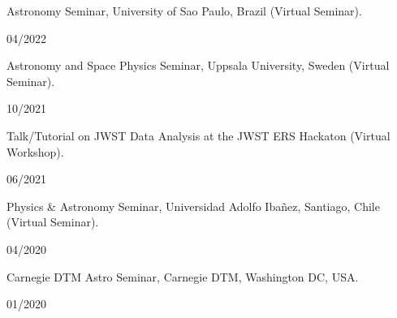 \documentclass[12pt, a4paper]{article} %
\begin{document}
\begin{minipage}[t]{0.7\textwidth}
\begin{flushleft}%
  \setlength{\leftskip}{0.2cm}%
Astronomy Seminar, University of Sao Paulo, Brazil (Virtual Seminar).
\end{flushleft}
\end{minipage}
\begin{minipage}[t]{0.3\textwidth}
\hfill 04/2022
\end{minipage}
\vspace{0.2cm}

\begin{minipage}[t]{0.7\textwidth}
\begin{flushleft}%
  \setlength{\leftskip}{0.2cm}%
Astronomy and Space Physics Seminar, Uppsala University, Sweden (Virtual Seminar).
\end{flushleft}
\end{minipage}
\begin{minipage}[t]{0.3\textwidth}
\hfill 10/2021
\end{minipage}
\vspace{0.2cm}

\begin{minipage}[t]{0.7\textwidth}
\begin{flushleft}%
  \setlength{\leftskip}{0.2cm}%
Talk/Tutorial on JWST Data Analysis at the JWST ERS Hackaton (Virtual Workshop).
\end{flushleft}
\end{minipage}
\begin{minipage}[t]{0.3\textwidth}
\hfill 06/2021
\end{minipage}
\vspace{0.2cm}

\begin{minipage}[t]{0.7\textwidth}
\begin{flushleft}%
  \setlength{\leftskip}{0.2cm}%
Physics \& Astronomy Seminar, Universidad Adolfo Iba\~nez, Santiago, Chile (Virtual Seminar).
\end{flushleft}
\end{minipage}
\begin{minipage}[t]{0.3\textwidth}
\hfill 04/2020
\end{minipage}
\vspace{0.2cm}

\begin{minipage}[t]{0.7\textwidth}
\begin{flushleft}%
  \setlength{\leftskip}{0.2cm}%
Carnegie DTM Astro Seminar, Carnegie DTM, Washington DC, USA.
\end{flushleft}
\end{minipage}
\begin{minipage}[t]{0.3\textwidth}
\hfill 01/2020
\end{minipage}
\vspace{0.2cm}
\end{document}
